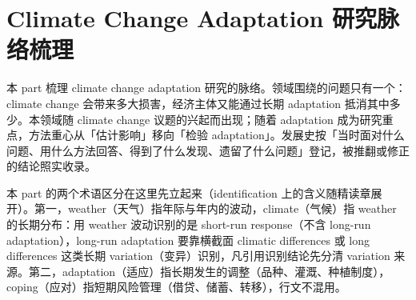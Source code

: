 
\chapter{Climate Change Adaptation 研究脉络梳理}
\label{ch:info-climate-change-adaptation}

本 part 梳理 climate change adaptation 研究的脉络。领域围绕的问题只有一个：climate change 会带来多大损害，经济主体又能通过长期 adaptation 抵消其中多少。本领域随 climate change 议题的兴起而出现；随着 adaptation 成为研究重点，方法重心从「估计影响」移向「检验 adaptation」。发展史按「当时面对什么问题、用什么方法回答、得到了什么发现、遗留了什么问题」登记，被推翻或修正的结论照实收录。


本 part 的两个术语区分在这里先立起来（identification 上的含义随精读章展开）。第一，weather（天气）指年际与年内的波动，climate（气候）指 weather 的长期分布：用 weather 波动识别的是 short-run response（不含 long-run adaptation），long-run adaptation 要靠横截面 climatic differences 或 long differences 这类长期 variation（变异）识别，凡引用识别结论先分清 variation 来源。第二，adaptation（适应）指长期发生的调整（品种、灌溉、种植制度），coping（应对）指短期风险管理（借贷、储蓄、转移），行文不混用。

